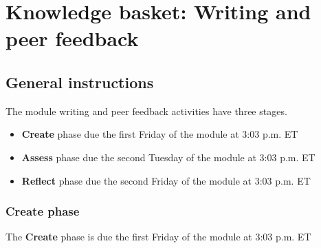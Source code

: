\documentclass[
  openany]{book}
\begin{document}
\hypertarget{knowledge-basket-writing-and-peer-feedback}{%
\chapter{Knowledge basket: Writing and peer feedback}\label{knowledge-basket-writing-and-peer-feedback}}

\hypertarget{writinggeneral}{%
\section{General instructions}\label{writinggeneral}}

The module writing and peer feedback activities have three stages.

\begin{itemize}
\item
  \textbf{Create} phase due the first Friday of the module at 3:03 p.m. ET
\item
  \textbf{Assess} phase due the second Tuesday of the module at 3:03 p.m. ET
\item
  \textbf{Reflect} phase due the second Friday of the module at 3:03 p.m. ET
\end{itemize}

\hypertarget{create-phase}{%
\subsection{Create phase}\label{create-phase}}

The \textbf{Create} phase is due the first Friday of the module at 3:03 p.m. ET
\end{document}
